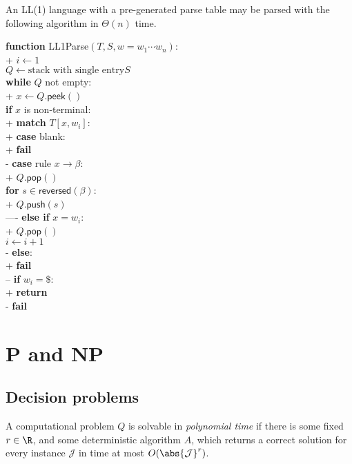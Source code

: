\documentclass{article}
\begin{document}
\begin{theorem}
	An LL(1) language with a pre-generated parse table may be 
	parsed with the following algorithm in $\Theta(n)$ time.

\begin{pseudo}
\textbf{function} \textsf{LL1Parse}$(T, S, w=w_1\cdots w_n)$:		\\+
	$i \leftarrow 1$												\\
	$Q \leftarrow\text{stack with single entry$S$}$					\\
	\textbf{while} $Q$ not empty:									\\+
		$x\leftarrow Q.\textsf{peek}()$								\\
		\textbf{if} $x$ is non-terminal:							\\+
			\textbf{match} $T[x,w_i]$:								\\+
				\textbf{case} blank:								\\+
					\textbf{fail}									\\-
				\textbf{case} rule $x\to\beta$:						\\+
					$Q.\textsf{pop}()$								\\
					\textbf{for} $s\in\textsf{reversed}(\beta)$:	\\+
						$Q.\textsf{push}(s)$						\\----
		\textbf{else if} $x = w_i$:									\\+
			$Q.\textsf{pop}()$										\\
			$i\leftarrow i+1$										\\-
		\textbf{else}:												\\+
			\textbf{fail}											\\--
	\textbf{if} $w_i=\$$:											\\+
		\textbf{return}												\\-
	\textbf{fail}
\end{pseudo}
\end{theorem}

\section{P and NP}

\subsection{Decision problems}

\begin{definition}
	A computational problem $Q$ is solvable in \emph{polynomial
	time} if there is some fixed $r\in\R$, and some deterministic
	algorithm $A$, which returns a correct solution for every
	instance $\mathcal{J}$ in time at most $O(\abs{\mathcal{J}}^r)$.
\end{definition}
\end{document}
